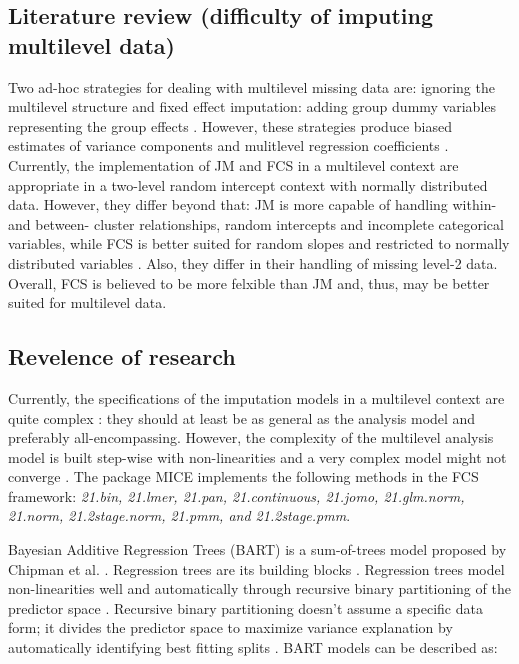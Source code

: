 \documentclass[10pt, a4paper, titlepage]{article}
\begin{document}
\subsection{Literature review (difficulty of imputing multilevel data)}
Two ad-hoc strategies for dealing with multilevel missing data are: ignoring the multilevel structure and fixed effect imputation: adding group dummy variables representing the group effects \cite{ludtke2017, enders2016}. However, these strategies produce biased estimates of variance components and mulitlevel regression coefficients \cite{ludtke2017}. Currently, the implementation of JM and FCS in a multilevel context are appropriate in a two-level random intercept context with normally distributed data. However, they differ beyond that: JM is more capable of handling within- and between- cluster relationships, random intercepts and incomplete categorical variables, while FCS is better suited for random slopes and restricted to normally distributed variables \cite{enders2016}. Also, they differ in their handling of missing level-2 data. Overall, FCS is believed to be more felxible than JM \cite{audigier2018} and, thus, may be better suited for multilevel data.

\subsection{Revelence of research}
Currently, the specifications of the imputation models in a multilevel context are quite complex \cite{buurenFlexibleImputationMissing2018}: they should at least be as general as the analysis model \cite{grund2018} and preferably all-encompassing. However, the complexity of the multilevel analysis model is built step-wise with non-linearities \cite{hox2017} and a very complex model might not converge \cite{buurenFlexibleImputationMissing2018}. The package MICE \cite{buuren2011} implements the following methods in the FCS framework: \textit{21.bin, 21.lmer, 21.pan, 21.continuous, 21.jomo, 21.glm.norm, 21.norm, 21.2stage.norm, 21.pmm, and 21.2stage.pmm}.

Bayesian Additive Regression Trees (BART) is a sum-of-trees model proposed by Chipman et al. \cite{chipman2010}. Regression trees are its building blocks \cite{chipman2010, hill2020, james2021}. Regression trees model non-linearities well and automatically through recursive binary partitioning of the predictor space \cite{hill2020}. Recursive binary partitioning doesn’t assume a specific data form; it divides the predictor space to maximize variance explanation by automatically identifying best fitting splits \cite{hastie2017, james2021, salditt2023}. BART models can be described as:
\end{document}
